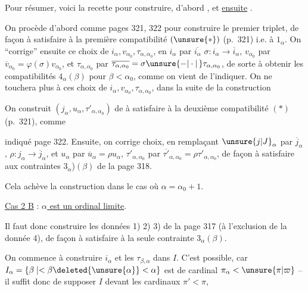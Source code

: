 Pour résumer, voici la recette pour construire, d'abord , et \uline{ensuite} .

On procède d'abord comme pages 321, 322 pour construire le premier triplet, de façon à satisfaire à la première compatibilité $(\unsure{*})$ (p.~321) i.e. à $1_\alpha$.
On ``corrige'' ensuite ce choix de $i_\alpha,v_{\alpha_0},\tau_{\alpha,\alpha_0}$, en  $i_\alpha$ par $\overline{i_\alpha}$  $\sigma:i_\alpha\to\overline{i}_\alpha$, $v_{\alpha_0}$ par $\overline{v}_{\alpha_0}=\varphi(\sigma)v_{\alpha_0}$, et $\tau_{\alpha,\alpha_0}$ par $\overline{\tau_{\alpha,\alpha_0}}=\sigma\unsure{-|\cdot|\,}\tau_{\alpha,\alpha_0}$, de sorte à obtenir les compatibilités $4_\alpha(\beta)$ pour $\beta<\alpha_0$, comme on vient de l'indiquer.
On ne touchera plus à ces choix de $i_\alpha,v_{\alpha_0},\tau_{\alpha,\alpha_0}$, dans la suite de la construction

On construit $(j_\alpha,u_\alpha,\tau'_{\alpha,\alpha_0})$ de  à satisfaire à la deuxième compatibilité $(*)$ (p.~321), comme

indiqué page 322. Ensuite, on corrige  choix, en remplaçant $\unsure{j|J}_\alpha$ par $\overline{j}_\alpha$,   $\rho:j_\alpha\to\overline{j}_\alpha$, et $u_\alpha$ par $\overline{u}_\alpha=\rho u_\alpha$, $\tau'_{\alpha,\alpha_0}$ par $\overline{\tau'}_{\alpha,\alpha_0}=\rho\tau'_{\alpha,\alpha_0}$, de façon à satisfaire aux contraintes \unsure{(}$3_\alpha$)$(\beta)$ de la page 318.

Cela achève la construction dans le cas où $\alpha=\alpha_0+1$. 

\uline{Cas 2 B} : \uline{$\alpha$ est un ordinal limite}.

Il faut donc construire les données 1) 2) 3) de la page 317 (à l'exclusion de la donnée 4), de façon à satisfaire à la seule contrainte $3_\alpha(\beta)$.

On commence à construire $i_\alpha$ et les $\tau_{\beta,\alpha}$ dans $I$. C'est possible, car $I_\alpha=\{\beta\mid<\beta\deleted{\unsure{\alpha}}<\alpha\}$ est de cardinal \deleted{$\unsure{\pi_\alpha}$} $\pi_\alpha<\unsure{\pi|\varpi}$ -- il suffit donc de supposer $I$  devant les cardinaux  $\pi'<\pi$,

